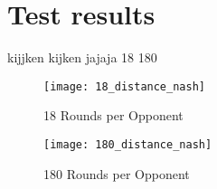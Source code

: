\section{Test results}
 
kijjken kijken jajaja 18 180



\begin{figure}[!htb]
	\texttt{[image: 18\_distance\_nash]}
	\caption{18 Rounds per Opponent}
	\label{fig:18_distance_nash}
	\endminipage\hfill
	\texttt{[image: 180\_distance\_nash]}
	\caption{180 Rounds per Opponent}
	\label{fig:180_distance_nash}
	\endminipage\hfill
\end{figure}








